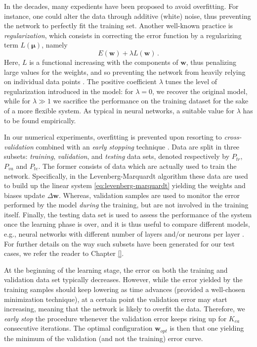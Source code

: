 \documentclass[12pt, a4paper, twoside, openright]{report}
\numberwithin{equation}{chapter}
\theoremstyle{theorem}
\theoremstyle{definition}
\theoremstyle{remark}
\theoremstyle{proposition}
\numberwithin{figure}{chapter}
\newcommand{\bg}[1]{\boldsymbol{#1}}
\begin{document}
		In the decades, many expedients have been proposed to avoid overfitting. For instance, one could alter the data through additive (white) noise, thus preventing the network to perfectly fit the training set. Another well-known practice is \emph{regularization}, which consists in correcting the error function by a regularizing term $L(\bg{\mu})$, namely
		\begin{equation*}
			E(\bg{w}) + \lambda L(\bg{w}) \, .
		\end{equation*}
		Here, $L$ is a functional increasing with the components of $\bg{w}$, thus penalizing large values for the weights, and so preventing the network from heavily relying on individual data points \cite{Mat16}. The positive coefficient $\lambda$ tunes the level of regularization introduced in the model: for $\lambda = 0$, we recover the original model, while for $\lambda \gg 1$ we sacrifice the performance on the training dataset for the sake of a more flexible system. As typical in neural networks, a suitable value for $\lambda$ has to be found empirically. 
		
		In our numerical experiments, overfitting is prevented upon resorting to \emph{cross-validation} combined with an \emph{early stopping} technique \cite{Koh95}. Data are split in three subsets: \emph{training}, \emph{validation}, and \emph{testing} data sets, denoted respectively by $P_{tr}$, $P_{va}$ and $P_{te}$. The former consists of data which are actually used to train the network. Specifically, in the Levenberg-Marquardt algorithm these data are used to build up the linear system \eqref{eq:levenberg-marquardt} yielding the weights and biases update $\Delta \bg{w}$. Whereas, validation samples are used to monitor the error performed by the model \emph{during} the training, but are not involved in the training itself. Finally, the testing data set is used to assess the performance of the system once the learning phase is over, and it is thus useful to compare different models, e.g., neural networks with different number of layers and/or neurons per layer \cite{Mat16}. For further details on the way such subsets have been generated for our test cases, we refer the reader to Chapter \ref{}.
		
		At the beginning of the learning stage, the error on both the training and validation data set typically decreases. However, while the error yielded by the training samples should keep lowering as time advances (provided a well-chosen minimization technique), at a certain point the validation error may start increasing, meaning that the network is likely to overfit the data. Therefore, we \emph{early stop} the procedure whenever the validation error keeps rising up for $K_{ea}$ consecutive iterations. The optimal configuration $\bg{w}_{opt}$ is then that one yielding the minimum of the validation (and not the training) error curve.
		
\end{document}
